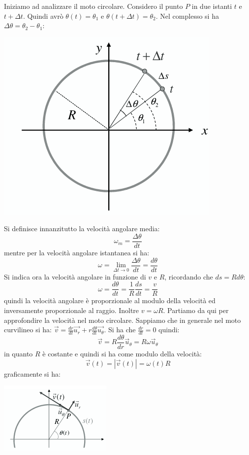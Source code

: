 \documentclass[a4paper,12pt, oneside]{book}
\begin{document}
Iniziamo ad analizzare il moto circolare. Considero il punto $P$ in due istanti $t$ e $t+\Delta t$. Quindi avrò $\theta (t)=\theta_1$ e $\theta(t+\Delta t)=\theta_2$. Nel complesso si ha $\Delta \theta= \theta_2-\theta_1$:
\begin{center}
\includegraphics[scale=0.52]{img/cir2.png}
\end{center}
Si definisce innanzitutto la velocità angolare media:
$$\omega_m=\frac{\Delta\theta}{dt}$$
mentre per la velocità angolare istantanea si ha:
$$\omega=\lim_{\Delta t\to 0}\frac{\Delta\theta}{dt}=\frac{d\theta}{dt}$$
Si indica ora la velocità angolare in funzione di $v$ e $R$, ricordando che $ds=Rd\theta$:
$$\omega=\frac{d\theta}{dt}=\frac{1}{R}\frac{ds}{dt}=\frac{v}{R}$$
quindi la velocità angolare è proporzionale al modulo della velocità ed inversamente proporzionale al raggio. Inoltre $v=\omega R$. Partiamo da qui per approfondire la velocità nel moto circolare. Sappiamo che in generale nel moto curvilineo si ha: $\vec{v}=\frac{dr}{dt}\vec{u_r}+r\frac{d\theta}{dt}\vec{u_\theta}$. Si ha che $\frac{dr}{dt}=0$ quindi:
$$\vec{v}=R\frac{d\theta}{dr}\vec{u}_\theta=R\omega\vec{u}_\theta$$
\newpage
in quanto $R$ è costante e quindi si ha come modulo della velocità:
$$\vec{v}(t)=|\vec{v}(t)|=\omega(t)R$$
graficamente si ha:
\begin{center}
\includegraphics[scale=0.9]{img/cir3.png}
\end{center}
\end{document}
